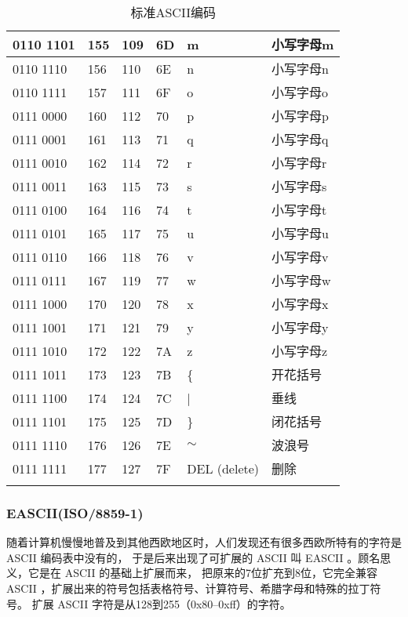 \begin{longtable}{| p{.10\linewidth} | p{.08\linewidth} | p{.08\linewidth} | p{.10\linewidth} | p{.28\linewidth} | p{.15\linewidth} |}
0110 1101 & 155 & 109 & 6D & m & 小写字母m \\ \hline
0110 1110 & 156 & 110 & 6E & n & 小写字母n \\ \hline
0110 1111 & 157 & 111 & 6F & o & 小写字母o \\ \hline
0111 0000 & 160 & 112 & 70 & p & 小写字母p \\ \hline
0111 0001 & 161 & 113 & 71 & q & 小写字母q \\ \hline
0111 0010 & 162 & 114 & 72 & r & 小写字母r \\ \hline
0111 0011 & 163 & 115 & 73 & s & 小写字母s \\ \hline
0111 0100 & 164 & 116 & 74 & t & 小写字母t \\ \hline
0111 0101 & 165 & 117 & 75 & u & 小写字母u \\ \hline
0111 0110 & 166 & 118 & 76 & v & 小写字母v \\ \hline
0111 0111 & 167 & 119 & 77 & w & 小写字母w \\ \hline
0111 1000 & 170 & 120 & 78 & x & 小写字母x \\ \hline
0111 1001 & 171 & 121 & 79 & y & 小写字母y \\ \hline
0111 1010 & 172 & 122 & 7A & z & 小写字母z \\ \hline
0111 1011 & 173 & 123 & 7B & \{ & 开花括号 \\ \hline
0111 1100 & 174 & 124 & 7C & | & 垂线 \\ \hline
0111 1101 & 175 & 125 & 7D & \} & 闭花括号 \\ \hline
0111 1110 & 176 & 126 & 7E & $\sim$  & 波浪号 \\ \hline
0111 1111 & 177 & 127 & 7F & DEL (delete) & 删除 \\ \hline
\caption{标准ASCII编码}
\label{table:ascii}
\centering
\end{longtable}

\subsubsection{EASCII(ISO/8859-1)}
随着计算机慢慢地普及到其他西欧地区时，人们发现还有很多西欧所特有的字符是 ASCII 编码表中没有的，
于是后来出现了可扩展的 ASCII 叫 EASCII 。顾名思义，它是在 ASCII 的基础上扩展而来，
把原来的7位扩充到8位，它完全兼容 ASCII ，扩展出来的符号包括表格符号、计算符号、希腊字母和特殊的拉丁符号。
扩展 ASCII 字符是从128到255（0x80--0xff）的字符。

